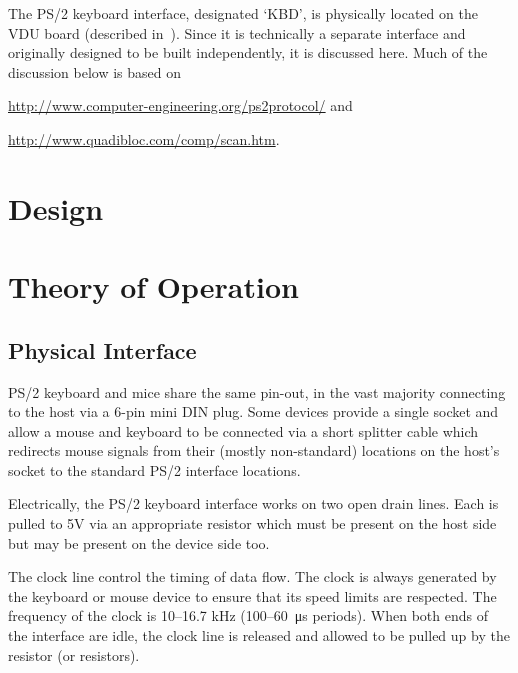 \label{chap:kbd}


The PS/2 keyboard interface, designated ‘KBD’, is physically located
on the VDU board (described in~). Since it is
technically a separate interface and originally designed to be built
independently, it is discussed here. Much of the discussion below is based on
\begin{center}
\url{http://www.computer-engineering.org/ps2protocol/} and

\url{http://www.quadibloc.com/comp/scan.htm}.
\end{center}

\section{Design}

\section{Theory of Operation}

\subsection{Physical Interface}

PS/2 keyboard and mice share the same pin-out, in the vast majority connecting
to the host via a 6-pin mini DIN plug. Some devices provide a single socket and
allow a mouse and keyboard to be connected via a short splitter cable which
redirects mouse signals from their (mostly non-standard) locations on the
host's socket to the standard PS/2 interface locations.

Electrically, the PS/2 keyboard interface works on two open drain lines. Each
is pulled to 5V via an appropriate resistor which must be present on the host
side but may be present on the device side too.

The clock line control the timing of data flow. The clock is always generated
by the keyboard or mouse device to ensure that its speed limits are
respected. The frequency of the clock is 10–16.7 kHz (100–60~μs periods). When
both ends of the interface are idle, the clock line is released and allowed to
be pulled up by the resistor (or resistors).


